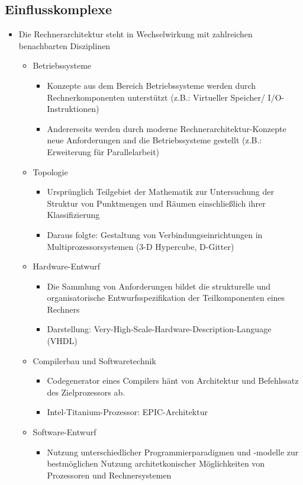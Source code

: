 \subsection{Einflusskomplexe}
\begin{itemize}
	\item Die Rechnerarchitektur steht in Wechselwirkung mit zahlreichen benachbarten Disziplinen
	\begin{itemize}
		\item Betriebssysteme
		\begin{itemize}
			\item Konzepte aus dem Bereich Betriebssysteme werden durch Rechnerkomponenten unterstützt (z.B.: Virtueller Speicher/ I/O-Instruktionen)
			\item Andererseits werden durch moderne Rechnerarchitektur-Konzepte neue Anforderungen and die Betriebssysteme gestellt (z.B.: Erweiterung für Parallelarbeit)
		\end{itemize}
		\item Topologie
		\begin{itemize}
			\item Ursprünglich Teilgebiet der Mathematik zur Untersuchung der Struktur von Punktmengen und Räumen einschließlich ihrer Klassifizierung
			\item Daraus folgte: Gestaltung von Verbindungseinrichtungen in Multiprozessorsystemen (3-D Hypercube, D-Gitter)
		\end{itemize}
		\item Hardware-Entwurf
		\begin{itemize}
			\item Die Sammlung von Anforderungen bildet die strukturelle und organisatorische Entwurfsspezifikation der Teilkomponenten eines Rechners
			\item Darstellung: Very-High-Scale-Hardware-Description-Language (VHDL)
		\end{itemize}
		\item Compilerbau und Softwaretechnik
		\begin{itemize}
		\item Codegenerator eines Compilers hänt von Architektur und Befehlssatz des Zielprozessors ab.
			\item Intel-Titanium-Prozessor: EPIC-Architektur
		\end{itemize}
		\item Software-Entwurf
		\begin{itemize}
			\item Nutzung unterschiedlicher Programmierparadigmen und -modelle zur bestmöglichen Nutzung architetkonischer Möglichkeiten von Prozessoren und Rechnersystemen

\end{itemize}
\end{itemize}
\end{itemize}
